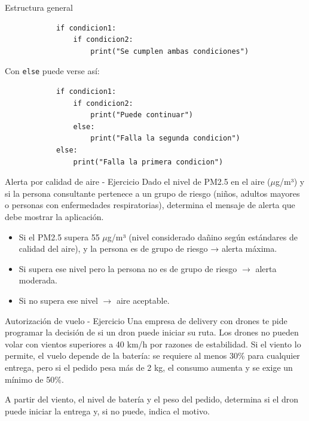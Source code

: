 \documentclass{beamer}
\begin{document}
    \begin{frame}[fragile,t]{Estructura general}
        \begin{verbatim}
            if condicion1:
                if condicion2:
                    print("Se cumplen ambas condiciones")
        \end{verbatim}
        Con \texttt{else} puede verse así:
        \begin{verbatim}
            if condicion1:
                if condicion2:
                    print("Puede continuar")
                else:
                    print("Falla la segunda condicion")
            else:
                print("Falla la primera condicion")
        \end{verbatim}
    \end{frame}

    \begin{frame}{Alerta por calidad de aire - Ejercicio}
        Dado el nivel de PM2.5 en el aire ($\mu$g/m³) y si la persona consultante pertenece 
        a un grupo de riesgo (niños, adultos mayores o personas con enfermedades respiratorias), 
        determina el mensaje de alerta que debe mostrar la aplicación.

        \begin{itemize}
            \item Si el PM2.5 supera 55 $\mu$g/m³ (nivel considerado dañino según estándares de 
            calidad del aire), y la persona es de grupo de riesgo → alerta máxima.
            \item Si supera ese nivel pero la persona no es de grupo de riesgo $\rightarrow$ alerta moderada.
            \item Si no supera ese nivel $\rightarrow$ aire aceptable.
        \end{itemize}
    \end{frame}

    \begin{frame}{Autorización de vuelo - Ejercicio}
        Una empresa de delivery con drones te pide programar la decisión de si un dron 
        puede iniciar su ruta. Los drones no pueden volar con vientos superiores a 40 km/h 
        por razones de estabilidad. Si el viento lo permite, el vuelo depende de la batería: 
        se requiere al menos 30\% para cualquier entrega, pero si el pedido pesa más de 2 kg, 
        el consumo aumenta y se exige un mínimo de 50\%.

        A partir del viento, el nivel de batería y el peso del pedido, determina si el dron 
        puede iniciar la entrega y, si no puede, indica el motivo.
    \end{frame}
\end{document}
